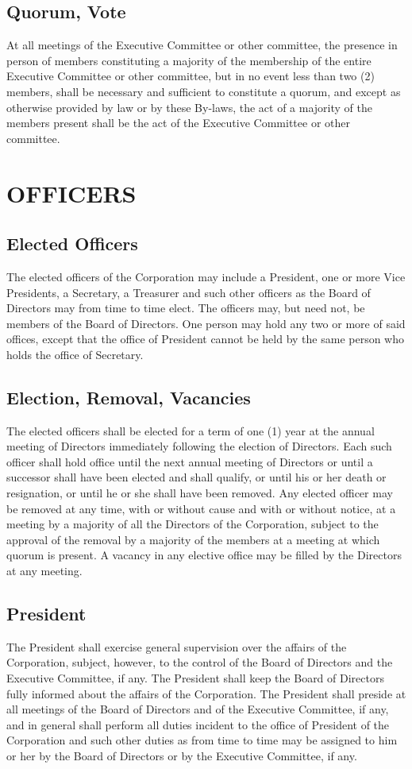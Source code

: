 \documentclass{article}
\begin{document}
\subsection{Quorum, Vote}
At all meetings of the Executive Committee or other committee, the presence in person of members constituting a majority of the membership of the entire Executive Committee or other committee, but in no event less than two (2) members, shall be necessary and sufficient to constitute a quorum, and except as otherwise provided by law or by these By-laws, the act of a majority of the members present shall be the act of the Executive Committee or other committee.
\section{OFFICERS}
\subsection{Elected Officers}
The elected officers of the Corporation may include a President, one or more Vice Presidents, a Secretary, a Treasurer and such other officers as the Board of Directors may from time to time elect.  The officers may, but need not, be members of the Board of Directors.  One person may hold any two or more of said offices, except that the office of President cannot be held by the same person who holds the office of Secretary.
\subsection{Election, Removal, Vacancies}
The elected officers shall be elected for a term of one (1) year at the annual meeting of Directors immediately following the election of Directors.  Each such officer shall hold office until the next annual meeting of Directors or until a successor shall have been elected and shall qualify, or until his or her death or resignation, or until he or she shall have been removed.  Any elected officer may be removed at any time, with or without cause and with or without notice, at a meeting by a majority of all the Directors of the Corporation, subject to the approval of the removal by a majority of the members at a meeting at which quorum is present.  A vacancy in any elective office may be filled by the Directors at any meeting.
\subsection{President}
The President shall exercise general supervision over the affairs of the Corporation, subject, however, to the control of the Board of Directors and the Executive Committee, if any.  The President shall keep the Board of Directors fully informed about the affairs of the Corporation.  The President shall preside at all meetings of the Board of Directors and of the Executive Committee, if any, and in general shall perform all duties incident to the office of President of the Corporation and such other duties as from time to time may be assigned to him or her by the Board of Directors or by the Executive Committee, if any.
\end{document}
